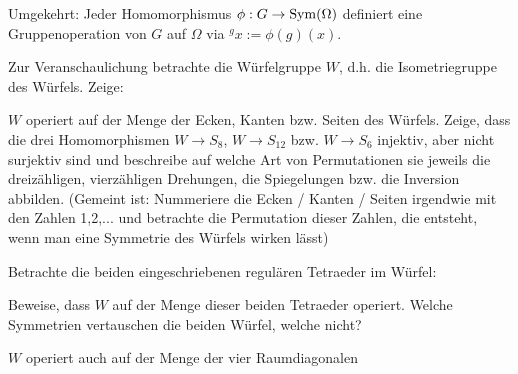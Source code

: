 \begin{sheet}
\begin{problem}[title={Gruppenhomomorphismen}]
\begin{subproblem}
Umgekehrt: Jeder Homomorphismus $\phi: G\to\operatorname{Sym}(\Omega)$ definiert eine Gruppenoperation von $G$ auf $\Omega$ via ${^g x} := \phi(g)(x)$.
\end{subproblem}

Zur Veranschaulichung betrachte die Würfelgruppe $W$, d.h. die Isometriegruppe des Würfels. Zeige:
\begin{subproblem}
$W$ operiert auf der Menge der Ecken, Kanten bzw. Seiten des Würfels. Zeige, dass die drei Homomorphismen $W\to S_8$, $W\to S_{12}$ bzw. $W\to S_6$ injektiv, aber nicht surjektiv sind und beschreibe auf welche Art von Permutationen sie jeweils die dreizähligen, vierzähligen Drehungen, die Spiegelungen bzw. die Inversion abbilden. (Gemeint ist: Nummeriere die Ecken / Kanten / Seiten irgendwie mit den Zahlen 1,2,... und betrachte die Permutation dieser Zahlen, die entsteht, wenn man eine Symmetrie des Würfels wirken lässt)
\end{subproblem}
\begin{subproblem}
Betrachte die beiden eingeschriebenen regulären Tetraeder im Würfel:


Beweise, dass $W$ auf der Menge dieser beiden Tetraeder operiert. Welche Symmetrien vertauschen die beiden Würfel, welche nicht?
\end{subproblem}

\begin{subproblem}
$W$ operiert auch auf der Menge der vier Raumdiagonalen

\end{subproblem}
\end{problem}
\end{sheet}
